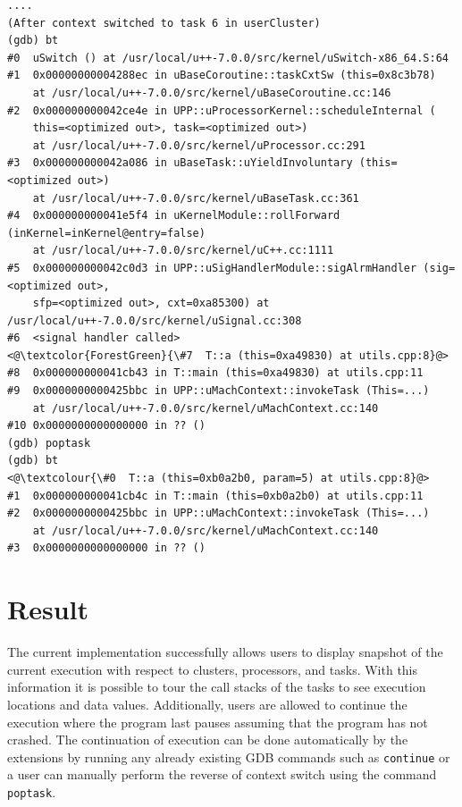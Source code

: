 \begin{lstlisting}[caption={\text{poptask} command}, label={poptask}]
....
(After context switched to task 6 in userCluster)
(gdb) bt
#0  uSwitch () at /usr/local/u++-7.0.0/src/kernel/uSwitch-x86_64.S:64
#1  0x00000000004288ec in uBaseCoroutine::taskCxtSw (this=0x8c3b78)
    at /usr/local/u++-7.0.0/src/kernel/uBaseCoroutine.cc:146
#2  0x000000000042ce4e in UPP::uProcessorKernel::scheduleInternal (
    this=<optimized out>, task=<optimized out>)
    at /usr/local/u++-7.0.0/src/kernel/uProcessor.cc:291
#3  0x000000000042a086 in uBaseTask::uYieldInvoluntary (this=<optimized out>)
    at /usr/local/u++-7.0.0/src/kernel/uBaseTask.cc:361
#4  0x000000000041e5f4 in uKernelModule::rollForward (inKernel=inKernel@entry=false)
    at /usr/local/u++-7.0.0/src/kernel/uC++.cc:1111
#5  0x000000000042c0d3 in UPP::uSigHandlerModule::sigAlrmHandler (sig=<optimized out>,
    sfp=<optimized out>, cxt=0xa85300) at /usr/local/u++-7.0.0/src/kernel/uSignal.cc:308
#6  <signal handler called>
<@\textcolor{ForestGreen}{\#7  T::a (this=0xa49830) at utils.cpp:8}@>
#8  0x000000000041cb43 in T::main (this=0xa49830) at utils.cpp:11
#9  0x0000000000425bbc in UPP::uMachContext::invokeTask (This=...)
    at /usr/local/u++-7.0.0/src/kernel/uMachContext.cc:140
#10 0x0000000000000000 in ?? ()
(gdb) poptask
(gdb) bt
<@\textcolour{\#0  T::a (this=0xb0a2b0, param=5) at utils.cpp:8}@>
#1  0x000000000041cb4c in T::main (this=0xb0a2b0) at utils.cpp:11
#2  0x0000000000425bbc in UPP::uMachContext::invokeTask (This=...)
    at /usr/local/u++-7.0.0/src/kernel/uMachContext.cc:140
#3  0x0000000000000000 in ?? ()
\end{lstlisting}

\section{Result}
The current implementation successfully allows users to display snapshot of the
current execution with respect to clusters, processors, and tasks. With this
information it is possible to tour the call stacks of the tasks to see execution
locations and data values. Additionally, users are allowed to continue the execution where the
program last pauses assuming that the program has not crashed. The continuation
of execution can be done automatically by the extensions by running any already
existing GDB commands such as \verb|continue| or a user can manually
perform the reverse of context switch using the command \verb|poptask|.
